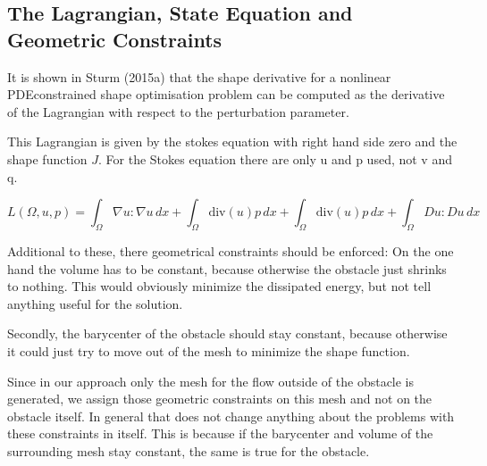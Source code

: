 \subsection{The Lagrangian, State Equation and Geometric Constraints}

It is shown in Sturm (2015a) that the shape derivative for a nonlinear PDEconstrained shape optimisation problem can be computed as the derivative of the Lagrangian with respect to the perturbation parameter.\cite{fully_semi_paper_sturm}

This Lagrangian is given by the stokes equation with right hand side zero and the shape function $J$.
For the Stokes equation there are only u and p used, not v and q.

\begin{equation}\label{eq:lagrangian}
    L(\Omega,u,p) = \int_{\Omega} \nabla u : \nabla u \, dx + \int_{\Omega} \mathrm{div}(u)p \, dx + \int_{\Omega} \mathrm{div}(u)p \, dx + \int_{\Omega} Du : Du \, dx
\end{equation}

Additional to these, there geometrical constraints should be  enforced: On the one hand the volume has to be constant, because otherwise the obstacle just shrinks to nothing. This would obviously minimize the dissipated energy, but not tell anything useful for the solution.

Secondly, the barycenter of the obstacle should stay constant, because otherwise it could just try to move out of the mesh to minimize the shape function.

Since in our approach only the mesh for the flow outside of the obstacle is generated, we assign those geometric constraints on this mesh and not on the obstacle itself. In general that does not change anything about the problems with these constraints in itself. This is because if the barycenter and volume of the surrounding mesh stay constant, the same is true for the obstacle.
